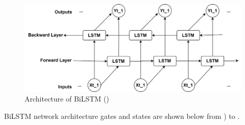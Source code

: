 \documentclass[a4paper, fleqn]{cas-sc}
\theoremstyle{definition}
\theoremstyle{remark}
\begin{document}
\begin{figure}[h!]
  \centering
  \includegraphics[scale=0.6]{Bilstm}
  \caption{Architecture of BiLSTM (\cite{article})} \label{Bilstm}
\end{figure}



BiLSTM network architecture gates and states are shown below from ) to .
\end{document}
